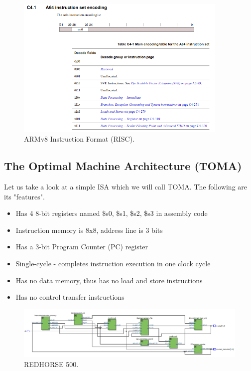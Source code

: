 \documentclass[a4paper, 11pt,oneside]{article}
\begin{document}
\begin{figure}[H]
	\begin{center}
	\includegraphics[width=4in]{armv8.png}
	\caption{ARMv8 Instruction Format (RISC).}
	\label{fig:armv8} 
	\end{center}
\end{figure}

\subsection{The Optimal Machine Architecture (TOMA)}
Let us take a look at a simple ISA which we will call TOMA. The following are 
its "features".
\begin{itemize}
\item Has 4 8-bit registers named \$s0, \$s1, \$s2, \$s3 in assembly code
\item Instruction memory is 8x8, address line is 3 bits
\item Has a 3-bit Program Counter (PC) register
\item Single-cycle - completes instruction execution in one clock cycle
\item Has no data memory, thus has no load and store instructions
\item Has no control transfer instructions

\end{itemize}

\begin{landscape}
\thispagestyle{plain}
\begin{figure}[H]
	\begin{center}
	\includegraphics[width=10.5in]{redhorse500.png}
	\caption{REDHORSE 500.}
	\label{fig:clock0} 
	\end{center}
\end{figure}
\end{landscape}
\end{document}
